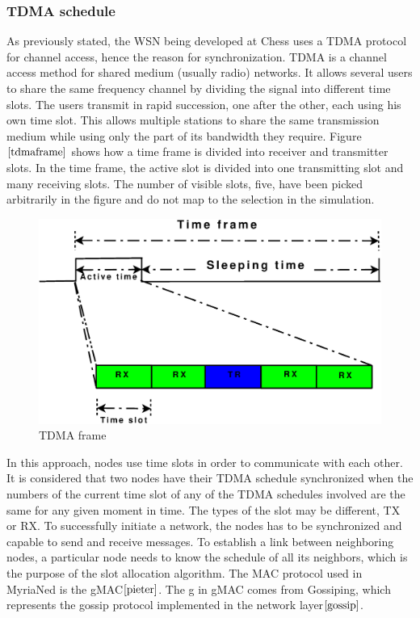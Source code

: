 \documentclass[a4paper,10pt]{report}
\begin{document}
\subsubsection{TDMA schedule}
As previously stated, the WSN being developed at Chess uses a TDMA protocol for channel access, hence the reason for synchronization.
TDMA is a channel access method for shared medium (usually radio) networks. It allows several users to share the same frequency
channel by dividing the signal into different time slots. The users transmit in rapid succession, one after the other, each using his
own time slot. This allows multiple stations to share the same transmission medium while using only the part of its bandwidth they
require. Figure $\ref{tdmaframe}$ shows how a time frame is divided into receiver and transmitter slots. In the time frame, the active
slot is divided into one transmitting slot and many receiving slots. The number of visible slots, five, have been picked
arbitrarily in the figure and do not map to the selection in the simulation.
\begin{figure}
\centering
\includegraphics[width=0.6 \textwidth]{tdmaframe}
\caption{TDMA frame} \label{tdmaframe}
\end{figure}
\newline In this approach, nodes use time slots in order to communicate with each other. It is considered that two nodes have
their TDMA schedule synchronized when the numbers of the current time slot of any of the TDMA schedules involved are the same for any
given moment in time. The types of the slot may be different, TX or RX. To successfully initiate a network, the nodes has to be
synchronized and capable to send and receive messages. To establish a link between neighboring nodes, a particular node needs to know
the schedule of all its neighbors, which is the purpose of the slot allocation algorithm. The MAC protocol used in MyriaNed is the gMAC$\cite{pieter}$. The g in gMAC comes from Gossiping, which represents the gossip protocol implemented in the network layer$\cite{gossip}$.
\newline
\end{document}
